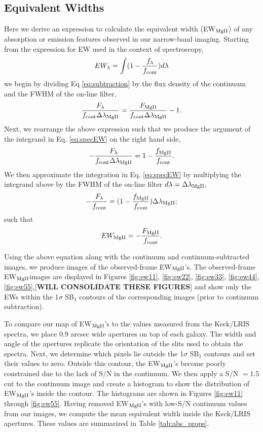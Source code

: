 \documentclass[twocolumn]{aastex61}
\begin{document}
\subsection{Equivalent Widths}\label{subsec.ew}
Here we derive an expression to calculate the equivalent width (EW$_{\rm{MgII}}$) of any absorption or emission features observed in our narrow-band imaging. Starting from the expression for EW used in the context of spectroscopy,
\begin{equation}
EW_{\lambda}=\int (1-\frac{f_{\lambda}}{f_{\rm{cont}}})d\lambda
\label{eq:specEW}
\end{equation}
we begin by dividing Eq \ref{eq:subtraction} by the flux density of the continuum and the FWHM of the on-line filter,
\begin{equation}
\frac{F_{\lambda}}{f_{\rm{cont}}\Delta \lambda_{\rm{MgII}}}=\frac{F_{\rm{MgII}}}{f_{\rm{cont}}\Delta \lambda_{\rm{MgII}}}- 1.
\end{equation}
Next, we rearrange the above expression such that we produce the argument of the integrand in Eq. \ref{eq:specEW} on the right hand side,
\begin{equation}
-\frac{F_{\lambda}}{f_{\rm{cont}}\Delta \lambda_{\rm{MgII}}}=1-\frac{f_{\rm{MgII}}}{f_{\rm{cont}}}.
\end{equation}
We then approximate the integration in Eq. \ref{eq:specEW} by multiplying the integrand above by the FWHM of the on-line filter $d\lambda=\Delta \lambda_{\rm{MgII}},$
\begin{equation}
-\frac{F_{\lambda}}{f_{\rm{cont}}}=(1-\frac{f_{\rm{MgII}}}{f_{\rm{cont}}})\Delta \lambda_{\rm{MgII}};
\end{equation}
such that
\begin{equation}
EW_{\rm{MgII}}=-\frac{F_{\rm{MgII}}}{f_{\rm{cont}}}.
\end{equation}

Using the above equation along with the continuum and continuum-subtracted images, we produce images of the observed-frame EW$_{\rm{MgII}}$'s. The observed-frame  EW$_{\rm{MgII}}$images are displayed in Figures \ref{fig:ew11}, \ref{fig:ew22}, \ref{fig:ew33}, \ref{fig:ew44}, \ref{fig:ew55},[\textbf{WILL CONSOLIDATE THESE FIGURES}] and show only the EWs within the 1$\sigma$ SB$_1$ contours of the corresponding  images (prior to continuum subtraction). 

To compare our map of EW$_{\rm{MgII}}$'s to the values measured from the Keck/LRIS spectra, we place 0.9 arcsec wide apertures on top of each galaxy. The width and angle of the apertures replicate the orientation of the slits used to obtain the spectra. Next, we determine which pixels lie outside the 1$\sigma$ SB$_1$ contours and set their values to zero. Outside this contour, the EW$_{\rm{MgII}}$'s become poorly constrained due to the lack of S/N in the continuum. We then apply a S/N $= 1.5$ cut to the continuum image and create a histogram to show the distribution of EW$_{\rm{MgII}}$'s inside the contour. The histograms are shown in Figures \ref{fig:ew11} through \ref{fig:ew55}. Having removed EW$_{\rm{MgII}}$'s with low-S/N continuum values from our images, we compute the mean equivalent width inside the Keck/LRIS apertures. These values are summarized in Table \ref{tab:abs_props}.
 
\end{document}
